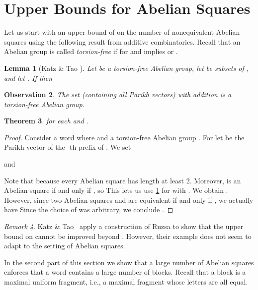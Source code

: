 \documentclass{article}
\theoremstyle{plain}
\newtheorem{theorem}{Theorem}[section]
\newtheorem{lemma}[theorem]{Lemma}
\newtheorem{observation}[theorem]{Observation}
\theoremstyle{definition}
\theoremstyle{remark}
\newtheorem{remark}[theorem]{Remark}
\begin{document}
  \section{Upper Bounds for Abelian Squares}\label{sec:upper}
  Let us start with an upper bound of  on the number
  of nonequivalent Abelian squares using the following result from additive combinatorics.
  Recall that an Abelian group  is called \emph{torsion-free} if  for  and  implies  or .
  \begin{lemma}[Katz \& Tao \cite{katz1999bounds}]\label{lem:tao}
  Let  be a torsion-free Abelian group, let  be subsets of , and let .
  If  then
  
  \end{lemma}

  \begin{observation}
    The set  (containing all Parikh vectors) with addition is
    a torsion-free Abelian group.
  \end{observation}
  
  \begin{theorem}
   for each  and .
  \end{theorem}
  \begin{proof}
  Consider a word  where  and a torsion-free Abelian group .
  For  let  be the Parikh
  vector of the -th prefix of . We set 
  
  and
  
  
  Note that  because every Abelian square has length at least 2.
  Moreover,  is an Abelian square if and only if ,
  so 
  This lets us use \cref{lem:tao} for  with .
  We obtain . However,
  since two Abelian squares  and  are equivalent if and only if ,
  we actually have 
  Since the choice of  was arbitrary, we conclude .
  \end{proof}
  
  \begin{remark}
    Katz \& Tao~\cite{katz1999bounds} apply a construction of Ruzsa \cite{ruzsa} to show
    that the upper bound on  cannot be improved beyond .
    However, their example does not seem to adapt to the setting of Abelian squares.
  \end{remark}
 
  In the second part of this section we show that a large number of
  Abelian squares enforces that a word contains a large number of blocks.
  Recall that a block is a maximal uniform fragment, i.e.,
  a maximal fragment whose letters are all equal.
  
\end{document}
